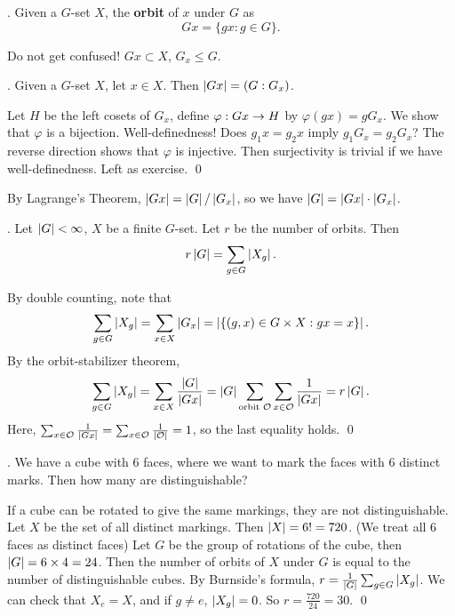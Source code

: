 .  Given a \(G\)-set \(X\), the \textbf{orbit} of \(x\) under \(G\) as
\[
    Gx = \{gx : g\in G\}.
\]

\rmk Do not get confused! \(Gx \subset X\), \(G_x \leq G\).

\thm.  Given a \(G\)-set \(X\), let \(x \in X\). Then \(\left| Gx \right| = \left(G : G_x\right)\).

\pf Let \(H\) be the left cosets of \(G_x\), define \(\varphi: Gx \rightarrow H\) by \(\varphi(gx) = gG_x\). We show that \(\varphi\) is a bijection. Well-definedness! Does \(g_1x = g_2x\) imply \(g_1 G_x = g_2 G_x\)? The reverse direction shows that \(\varphi\) is injective. Then surjectivity is trivial if we have well-definedness. Left as exercise. \qed

By Lagrange's Theorem, \(\left| Gx \right| = \left| G \right| / \left| G_x \right|\), so we have \(\left| G \right| = \left| Gx \right| \cdot \left| G_x \right|\).


\thm.  Let \(\left| G \right| < \infty\), \(X\) be a finite \(G\)-set. Let \(r\) be the number of orbits. Then
\[
    r \left| G \right| = \sum_{g\in G} \left| X_g \right|.
\]

\pf By double counting, note that
\[
    \sum_{g \in G} \left| X_g \right| = \sum_{x \in X} \left| G_x \right| = \left| \{ (g, x) \in G\times X : gx = x\} \right|.
\]
By the orbit-stabilizer theorem,
\[
    \sum_{g \in G} \left| X_g \right| = \sum_{x \in X} \frac{\left| G \right|}{\left| G x \right|} = \left| G \right| \sum_{\text{orbit } \mathcal{O}}\sum_{x \in \mathcal{O}} \frac{1}{\left| Gx \right|} = r \left| G \right|.
\]
Here, \(\sum_{x \in \mathcal{O}} \frac{1}{\left| Gx \right|} = \sum_{x \in \mathcal{O}} \frac{1}{\left| \mathcal{O} \right|} = 1\), so the last equality holds. \qed

\ex. We have a cube with 6 faces, where we want to mark the faces with 6 distinct marks. Then how many are distinguishable?

\pf If a cube can be rotated to give the same markings, they are not distinguishable. Let \(X\) be the set of all distinct markings. Then \(\left| X \right| = 6! = 720\). (We treat all 6 faces as distinct faces) Let \(G\) be the group of rotations of the cube, then \(\left| G \right| = 6 \times 4 = 24\). Then the number of orbits of \(X\) under \(G\) is equal to the number of distinguishable cubes. By Burnside's formula, \(r =\frac{1}{\left| G \right|}\sum_{g \in G} \left| X_g \right|\). We can check that \(X_e = X\), and if \(g\neq e\), \(\left| X_g \right| = 0\). So \(r = \frac{720}{24} = 30\). \qed

\pagebreak

